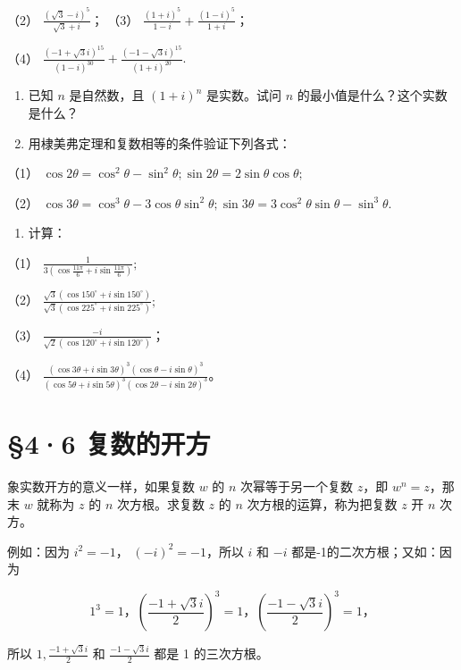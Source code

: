 （2） \(\frac{(\sqrt{3} - i)^5}{\sqrt{3} + i}\)； （3）
\(\frac{(1 + i)^5}{1 - i} + \frac{(1 - i)^5}{1 + i}\)；

（4）
\(\frac{(-1 + \sqrt{3}i)^{15}}{(1 - i)^{30}} + \frac{(-1 - \sqrt{3}i)^{15}}{(1 + i)^{20}}.\)

\begin{enumerate}[start=3]
\item
  已知 \(n\) 是自然数，且 \((1 + i)^n\) 是实数。试问 \(n\)
  的最小值是什么？这个实数是什么？
\item
  用棣美弗定理和复数相等的条件验证下列各式：
\end{enumerate}

（1）
\(\cos 2\theta = \cos^2\theta -\sin^2\theta ;\sin 2\theta = 2\sin \theta \cos \theta ;\)

（2）
\(\cos 3\theta = \cos^3\theta - 3\cos \theta \sin^2\theta; \sin 3\theta = 3\cos^2\theta \sin \theta - \sin^3\theta.\)

\begin{enumerate}[start=5]
\item
  计算：
\end{enumerate}

（1）
\(\frac{1}{3\left(\cos\frac{11\pi}{6}+i\sin\frac{11\pi}{6}\right)};\)

（2）
\(\frac{\sqrt{3} (\cos 150^{\circ} + i\sin 150^{\circ})}{\sqrt{3} (\cos 225^{\circ} + i\sin 225^{\circ})};\)

（3） \(\frac{-i}{\sqrt{2} (\cos 120^{\circ} + i \sin 120^{\circ})}\)；

（4）
\(\frac{(\cos 3\theta + i\sin 3\theta)^3 (\cos \theta - i\sin \theta)^3}{(\cos 5\theta + i\sin 5\theta)^3 (\cos 2\theta - i\sin 2\theta)^3}\)。

\section{§4·6 复数的开方}

象实数开方的意义一样，如果复数 \(w\) 的 \(n\) 次幂等于另一个复数
\(z\)，即 \(w^n = z\)，那末 \(w\) 就称为 \(z\) 的 \(n\) 次方根。求复数
\(z\) 的 \(n\) 次方根的运算，称为把复数 \(z\) 开 \(n\) 次方。

例如：因为 \(i^2 = -1\)， \((-i)^2 = -1\)，所以 \(i\) 和 \(-i\)
都是-1的二次方根；又如：因为

\[
1 ^ {3} = 1\text{，} \left(\frac {- 1 + \sqrt {3} i}{2}\right) ^ {3} = 1\text{，} \left(\frac {- 1 - \sqrt {3} i}{2}\right) ^ {3} = 1\text{，}
\]

所以 \(1, \frac{-1 + \sqrt{3}i}{2}\) 和 \(\frac{-1 - \sqrt{3}i}{2}\)
都是 1 的三次方根。

